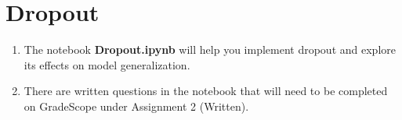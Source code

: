 \section{Dropout}

\begin{enumerate}
    \item {} The notebook \textbf{Dropout.ipynb} will help you implement dropout and explore its effects on model generalization.
    \item {} There are written questions in the notebook that will need to be completed on GradeScope under Assignment 2 (Written).
\end{enumerate}